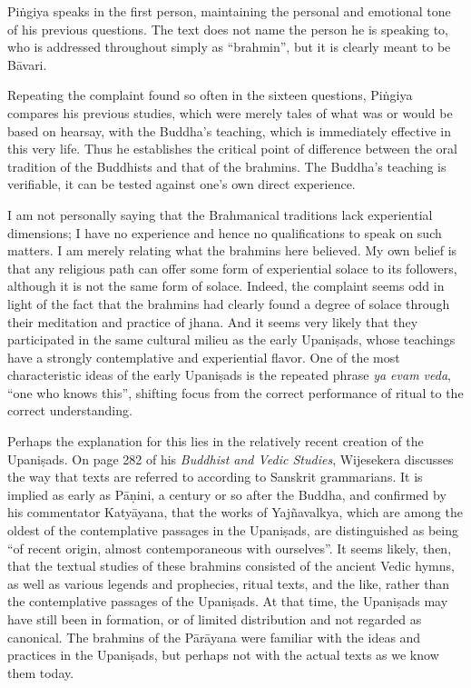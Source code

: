 \documentclass[12pt,openany]{book}%
\begin{document}
\textsanskrit{Piṅgiya} speaks in the first person, maintaining the personal and emotional tone of his previous questions. The text does not name the person he is speaking to, who is addressed throughout simply as “brahmin”, but it is clearly meant to be \textsanskrit{Bāvari}.

Repeating the complaint found so often in the sixteen questions, \textsanskrit{Piṅgiya} compares his previous studies, which were merely tales of what was or would be based on hearsay, with the Buddha’s teaching, which is immediately effective in this very life. Thus he establishes the critical point of difference between the oral tradition of the Buddhists and that of the brahmins. The Buddha’s teaching is verifiable, it can be tested against one’s own direct experience.

I am not personally saying that the Brahmanical traditions lack experiential dimensions; I have no experience and hence no qualifications to speak on such matters. I am merely relating what the brahmins here believed. My own belief is that any religious path can offer some form of experiential solace to its followers, although it is not the same form of solace. Indeed, the complaint seems odd in light of the fact that the brahmins had clearly found a degree of solace through their meditation and practice of jhana. And it seems very likely that they participated in the same cultural milieu as the early \textsanskrit{Upaniṣads}, whose teachings have a strongly contemplative and experiential flavor. One of the most characteristic ideas of the early \textsanskrit{Upaniṣads} is the repeated phrase \textit{ya evam veda}, “one who knows this”, shifting focus from the correct performance of ritual to the correct understanding.

Perhaps the explanation for this lies in the relatively recent creation of the \textsanskrit{Upaniṣads}. On page 282 of his \textit{Buddhist and Vedic Studies}, Wijesekera discusses the way that texts are referred to according to Sanskrit grammarians. It is implied as early as \textsanskrit{Pāṇini}, a century or so after the Buddha, and confirmed by his commentator \textsanskrit{Katyāyana}, that the works of \textsanskrit{Yajñavalkya}, which are among the oldest of the contemplative passages in the \textsanskrit{Upaniṣads}, are distinguished as being “of recent origin, almost contemporaneous with ourselves”. It seems likely, then, that the textual studies of these brahmins consisted of the ancient Vedic hymns, as well as various legends and prophecies, ritual texts, and the like, rather than the contemplative passages of the \textsanskrit{Upaniṣads}. At that time, the \textsanskrit{Upaniṣads} may have still been in formation, or of limited distribution and not regarded as canonical. The brahmins of the \textsanskrit{Pārāyana} were familiar with the ideas and practices in the \textsanskrit{Upaniṣads}, but perhaps not with the actual texts as we know them today.
\end{document}
